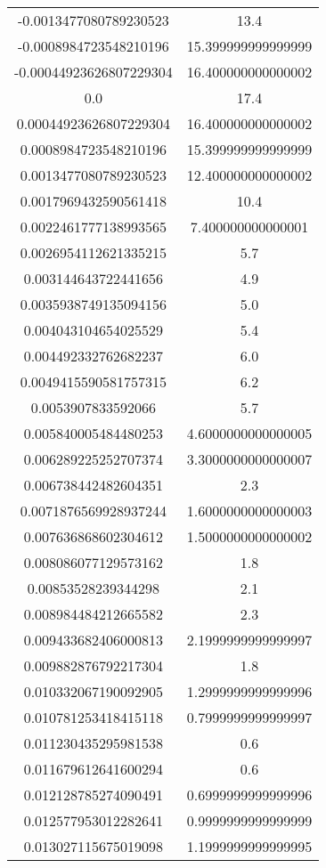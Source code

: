 \begin{table}
\begin{tabular}{S[]S[]}
-0.0013477080789230523 & 13.4\\
-0.0008984723548210196 & 15.399999999999999\\
-0.00044923626807229304 & 16.400000000000002\\
0.0 & 17.4\\
0.00044923626807229304 & 16.400000000000002\\
0.0008984723548210196 & 15.399999999999999\\
0.0013477080789230523 & 12.400000000000002\\
0.0017969432590561418 & 10.4\\
0.0022461777138993565 & 7.400000000000001\\
0.0026954112621335215 & 5.7\\
0.003144643722441656 & 4.9\\
0.0035938749135094156 & 5.0\\
0.004043104654025529 & 5.4\\
0.004492332762682237 & 6.0\\
0.0049415590581757315 & 6.2\\
0.0053907833592066 & 5.7\\
0.005840005484480253 & 4.6000000000000005\\
0.006289225252707374 & 3.3000000000000007\\
0.006738442482604351 & 2.3\\
0.0071876569928937244 & 1.6000000000000003\\
0.007636868602304612 & 1.5000000000000002\\
0.008086077129573162 & 1.8\\
0.00853528239344298 & 2.1\\
0.008984484212665582 & 2.3\\
0.009433682406000813 & 2.1999999999999997\\
0.009882876792217304 & 1.8\\
0.010332067190092905 & 1.2999999999999996\\
0.010781253418415118 & 0.7999999999999997\\
0.011230435295981538 & 0.6\\
0.011679612641600294 & 0.6\\
0.012128785274090491 & 0.6999999999999996\\
0.012577953012282641 & 0.9999999999999999\\
0.013027115675019098 & 1.1999999999999995\\
\bottomrule
\end{tabular}\end{table}
